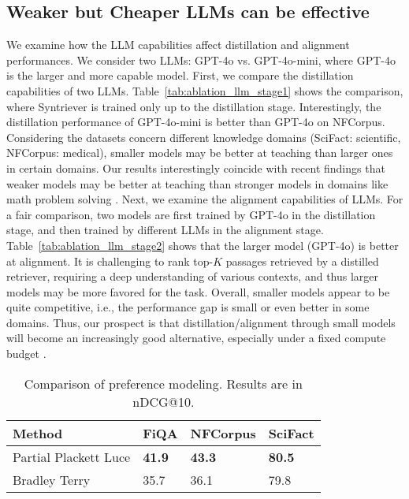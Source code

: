 \subsection{Weaker but Cheaper LLMs can be effective}
We examine how the LLM capabilities affect distillation and alignment performances. We consider two LLMs: GPT-4o vs. GPT-4o-mini, where GPT-4o is the larger and more capable model. First, we compare the distillation capabilities of two LLMs. Table~\ref{tab:ablation_llm_stage1} shows the comparison, where Syntriever is trained only up to the distillation stage. Interestingly, the distillation performance of GPT-4o-mini is better than GPT-4o on NFCorpus. Considering the datasets concern different knowledge domains (SciFact: scientific, NFCorpus: medical), smaller models may be better at teaching than larger ones in certain domains. Our results interestingly coincide with recent findings that weaker models may be better at teaching than stronger models in domains like math problem solving \cite{bansal2024smaller}.
Next, we examine the alignment capabilities of LLMs. For a fair comparison, two models are first trained by GPT-4o in the distillation stage, and then trained by different LLMs in the alignment stage. Table~\ref{tab:ablation_llm_stage2} shows that the larger model (GPT-4o) is better at alignment. It is challenging to rank top-$K$ passages retrieved by a distilled retriever, requiring a deep understanding of various contexts, and thus larger models may be more favored for the task. Overall, smaller models appear to be quite competitive, i.e., the performance gap is small or even better in some domains. Thus, our prospect is that distillation/alignment through small models will become an increasingly good alternative, especially under a fixed compute budget  \cite{bansal2024smaller}.


\begin{table}[t!]
\centering
\begin{adjustbox}{width=.5\textwidth,center}
\begin{tabular}{l|l|l|l}
\hline
\textbf{Method}  & \textbf{FiQA}  & \textbf{NFCorpus} & \textbf{SciFact} \\ \hline
\multirow{1}{*}{Partial Plackett Luce}  & \textbf{41.9} & \textbf{43.3} & \textbf{80.5}\\ 
\multirow{1}{*}{Bradley Terry}  & 35.7 & 36.1  & 79.8              \\ \hline

\end{tabular}
\end{adjustbox}
\caption{Comparison of preference modeling. Results are in nDCG@10.}
\label{tab:ablation_loss}
\end{table}

